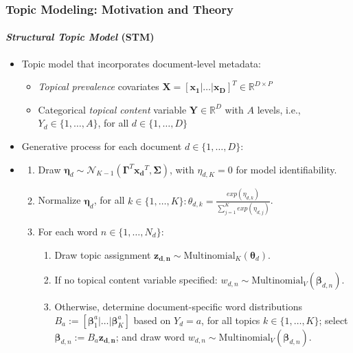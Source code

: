 \documentclass[xcolor=dvipsnames]{beamer}
\begin{document}
\begin{frame}
\frametitle{Topic Modeling: Motivation and Theory}
\framesubtitle{\textit{Structural Topic Model} (STM)}
\begin{itemize}
\item Topic model that incorporates document-level metadata: 
\begin{itemize}
\item \textit{Topical prevalence} covariates $\boldsymbol{X}=[\boldsymbol{x_1}|\dots|\boldsymbol{x_D}]^T \in \mathbb{R}^{D \times P}$
\item Categorical \textit{topical content} variable $\boldsymbol{Y}\in \mathbb{R}^D$ with $A$ levels, i.e., $Y_d \in \{1,\dots,A\}$, for all $d \in \{1,\dots,D\}$
\end{itemize}
\item Generative process for each document $d \in \{1,\dots,D\}$:
\item[] 
\begin{enumerate}[{1)}]
\item Draw $\boldsymbol{\eta}_d \sim \mathcal{N}_{K-1}(\boldsymbol{\Gamma}^T\boldsymbol{x_d}^T, \boldsymbol{\Sigma})$, with $\eta_{d,K}=0$ for model identifiability.
\item Normalize $\boldsymbol{\eta}_d$, for all $k \in \{1,\dots,K\}: \theta_{d,k} = \frac{exp(\eta_{d,k})}{\sum_{j=1}^{K}exp(\eta_{d,j})}$.
\item For each word $n \in \{1,\dots,N_d\}$:
	\begin{enumerate}[{a)}]
    \item Draw topic assignment $\boldsymbol{z_{d,n}} \sim \text{Multinomial}_K(\boldsymbol{\theta}_d)$.
    \item If no topical content variable specified: $w_{d,n} \sim \text{Multinomial}_V(\boldsymbol{\beta}_{d,n})$. 
    \item Otherwise, determine document-specific word distributions $B_a := [\boldsymbol{\beta}^a_1|\dots|\boldsymbol{\beta}^a_K]$ based on $Y_d=a$, for all topics $k \in \{1,\dots,K\}$; select $\boldsymbol{\beta}_{d,n}:=B_a\boldsymbol{z_{d,n}}$; and draw word $w_{d,n} \sim \text{Multinomial}_V(\boldsymbol{\beta}_{d,n})$.
	\end{enumerate}
\end{enumerate}
\end{itemize}
\end{frame}
\end{document}
